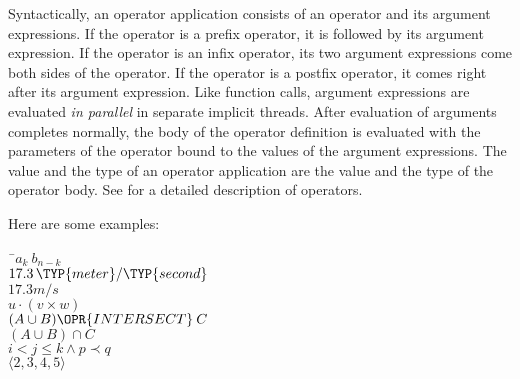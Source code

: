 Syntactically, an operator application consists of an operator and its
argument expressions.  If the operator is a prefix operator, it is followed
by its argument expression.  If the operator is an infix operator, its two
argument expressions come both sides of the operator.  If the operator is a
postfix operator, it comes right after its argument expression.
Like function calls,
argument expressions are evaluated \emph{in parallel} in separate implicit threads.
After evaluation of arguments completes normally,
the body of the operator definition is evaluated
with the parameters of the operator bound to the values of the argument
expressions.  The value and the type of an operator application are the
value and the type of the operator body.
See  for a detailed description of operators.


Here are some examples:



\begin{Fortress}
{\tt~}\pushtabs\=\+\( a_k\:b_{n-k}\)\\
\( 17.3\,\TYP{meter}/\TYP{second}\)\\
\( 17.3 m/s\)\\
\( u \cdot (v \times w)\)\\
\( (A \cup B) \OPR{INTERSECT}\:C\)\\
\( (A \cup B) \cap C\)\\
\( i < j \leq k \wedge p \prec q\)\\
\( \langle{}2, 3, 4, 5\rangle\)\-\\\poptabs
\end{Fortress}
